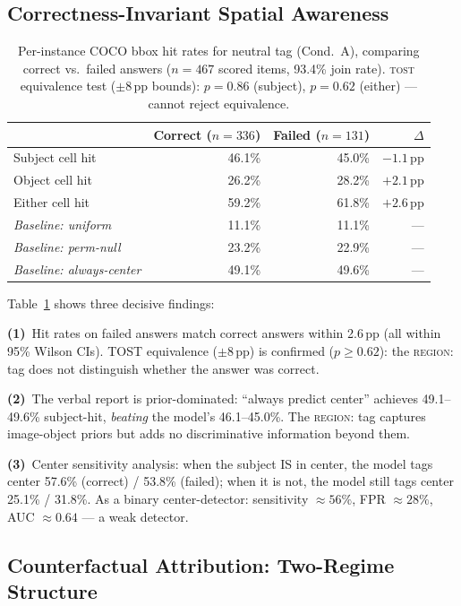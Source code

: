 \documentclass[11pt]{article}
\begin{document}
\subsection{Correctness-Invariant Spatial Awareness}
\label{sec:coco}

\begin{table}[t]
\centering
\small
\begin{tabular}{lrrr}
\toprule
 & Correct ($n{=}336$) & Failed ($n{=}131$) & $\Delta$ \\
\midrule
Subject cell hit & 46.1\% & 45.0\% & $-1.1$\,pp \\
Object cell hit & 26.2\% & 28.2\% & $+2.1$\,pp \\
Either cell hit & 59.2\% & 61.8\% & $+2.6$\,pp \\
\midrule
\emph{Baseline: uniform} & 11.1\% & 11.1\% & — \\
\emph{Baseline: perm-null} & 23.2\% & 22.9\% & — \\
\emph{Baseline: always-center} & 49.1\% & 49.6\% & — \\
\bottomrule
\end{tabular}
\caption{Per-instance COCO bbox hit rates for neutral tag (Cond.\ A),
comparing correct vs.\ failed answers ($n{=}467$ scored items, 93.4\% join rate).
\textsc{tost} equivalence test ($\pm 8$\,pp bounds): $p{=}0.86$ (subject),
$p{=}0.62$ (either) — cannot reject equivalence.}
\label{tab:coco}
\end{table}

Table~\ref{tab:coco} shows three decisive findings:

\textbf{(1)}~Hit rates on failed answers match correct answers within 2.6\,pp
(all within 95\% Wilson CIs).
TOST equivalence ($\pm 8$\,pp) is confirmed ($p{\geq}0.62$):
the \textsc{region:} tag does not distinguish whether the answer was correct.

\textbf{(2)}~The verbal report is prior-dominated:
``always predict center'' achieves 49.1--49.6\% subject-hit, \emph{beating} the
model's 46.1--45.0\%.
The \textsc{region:} tag captures image-object priors but adds no discriminative
information beyond them.

\textbf{(3)}~Center sensitivity analysis:
when the subject IS in center, the model tags center 57.6\% (correct) /
53.8\% (failed); when it is not, the model still tags center 25.1\% / 31.8\%.
As a binary center-detector: sensitivity ${\approx}56\%$, FPR ${\approx}28\%$,
AUC ${\approx}0.64$ — a weak detector.

\subsection{Counterfactual Attribution: Two-Regime Structure}
\label{sec:cf}
\end{document}
